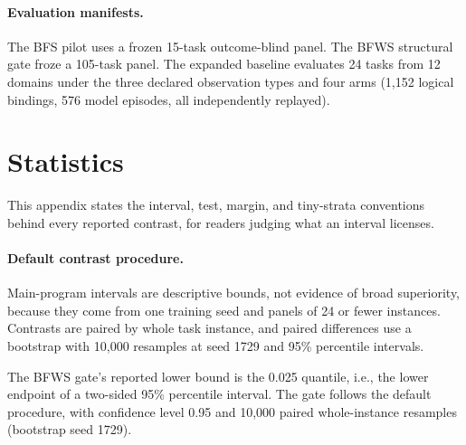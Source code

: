 \paragraph{Evaluation manifests.}
The BFS pilot uses a frozen 15-task outcome-blind panel. The BFWS structural gate froze a 105-task panel. The expanded baseline evaluates 24 tasks from 12 domains under the three declared observation types and four arms (1,152 logical bindings, 576 model episodes, all independently replayed).


\section{Statistics}
\label{app:statistics}

This appendix states the interval, test, margin, and tiny-strata conventions behind every reported contrast, for readers judging what an interval licenses.

\paragraph{Default contrast procedure.}
Main-program intervals are descriptive bounds, not evidence of broad superiority, because they come from one training seed and panels of 24 or fewer instances. Contrasts are paired by whole task instance, and paired differences use a bootstrap with 10,000 resamples at seed 1729 and 95\% percentile intervals.

The BFWS gate's reported lower bound is the 0.025 quantile, i.e., the lower endpoint of a two-sided 95\% percentile interval. The gate follows the default procedure, with confidence level 0.95 and 10,000 paired whole-instance resamples (bootstrap seed 1729).

